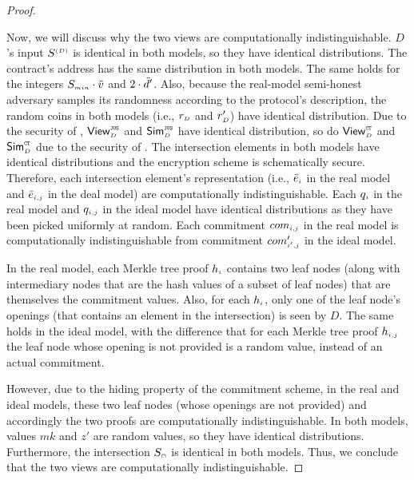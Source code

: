 \begin{proof}
\begin{enumerate}
%
\end{enumerate}
 

 Now, we will discuss why the two views are computationally indistinguishable.  $D$'s input $S^{\scriptscriptstyle (D)}$ is
 identical in both models, so they have identical distributions.  The contract's address has the same distribution in both models. The same holds for the integers $S_{\scriptscriptstyle min}\cdot \ddot{v}$ and $ 2\cdot \ddot{d}'$. Also, because the real-model semi-honest adversary samples its randomness according to the protocol’s description, the random coins in both models (i.e., $r_{\scriptscriptstyle D}$  and $r'_{\scriptscriptstyle D}$) have identical distribution. Due to the security of \fpsi, $\mathsf{View}^{\scriptscriptstyle \mathtt{JUS}}_{\scriptscriptstyle D}$ and $\mathsf{Sim}^{\scriptscriptstyle \mathtt{JUS}}_{\scriptscriptstyle D}$ have identical distribution, so do  $\mathsf{View}^{\scriptscriptstyle \mathtt{CT}}_{\scriptscriptstyle D}$ and $\mathsf{Sim}^{\scriptscriptstyle \mathtt{CT}}_{\scriptscriptstyle D}$ due to the security of \ct. The intersection elements in both models have identical distributions and the encryption scheme is schematically secure. Therefore, each intersection element's representation (i.e., $\bar{e}_{\scriptscriptstyle i}$ in the real model and $\bar{e}_{\scriptscriptstyle i, j}$ in the deal model) are computationally indistinguishable. Each $q_{\scriptscriptstyle i}$ in the real model and $q_{\scriptscriptstyle i, j}$ in the ideal model have identical distributions as they have been picked uniformly at random. Each commitment $com_{\scriptscriptstyle i,j}$ in the real model is computationally indistinguishable from commitment $com'_{\scriptscriptstyle i',j}$ in the ideal model. 
 
 
 
 
 In the real model, each Merkle tree proof $h_{\scriptscriptstyle i}$ contains two leaf nodes (along with intermediary nodes that are the hash values of a subset of leaf nodes) that are themselves the commitment values. Also, for each $h_{\scriptscriptstyle i}$, only one of the leaf node's openings (that contains an element in the intersection) is seen by $D$. The same holds in the ideal model, with the difference that for each Merkle tree proof $h_{\scriptscriptstyle i, j}$ the leaf node whose opening is not provided is a random value, instead of an actual commitment. 
 
 However, due to the hiding property of the commitment scheme, in the real and ideal models,  these two leaf nodes (whose openings are not provided) and accordingly the two proofs are computationally indistinguishable. In both models, values $mk$ and $z'$ are random values, so they have identical distributions. Furthermore, the intersection $S_{\scriptscriptstyle \cap}$ is identical in both models. Thus, we conclude that the two views are computationally indistinguishable.
 

\end{proof}
